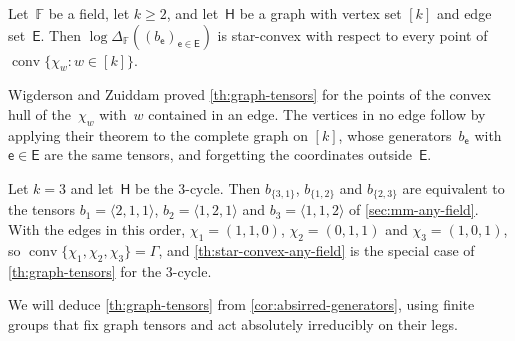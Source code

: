 \documentclass[11pt,letterpaper]{article}
\newcommand{\FF}{\mathbb{F}}
\DeclareMathOperator{\conv}{conv}
\begin{document}
\begin{theorem}\label{th:graph-tensors}
Let~$\FF$ be a field, let $k \geq 2$, and let~$\mathsf{H}$ be a graph with vertex set $[k]$ and edge set~$\mathsf{E}$. Then $\log \Delta_\FF((b_{\mathsf{e}})_{\mathsf{e} \in \mathsf{E}})$ is star-convex with respect to every point of $\conv\{\chi_w : w \in [k]\}$.
\end{theorem}

Wigderson and Zuiddam proved \cref{th:graph-tensors} for the points of the convex hull of the~$\chi_w$ with~$w$ contained in an edge. The vertices in no edge follow by applying their theorem to the complete graph on $[k]$, whose generators~$b_{\mathsf{e}}$ with $\mathsf{e} \in \mathsf{E}$ are the same tensors, and forgetting the coordinates outside~$\mathsf{E}$.

Let $k = 3$ and let~$\mathsf{H}$ be the $3$-cycle. Then $b_{\{3,1\}}$, $b_{\{1,2\}}$ and $b_{\{2,3\}}$ are equivalent to the tensors $b_1 = \langle 2,1,1 \rangle$, $b_2 = \langle 1,2,1 \rangle$ and $b_3 = \langle 1,1,2 \rangle$ of \cref{sec:mm-any-field}. With the edges in this order, $\chi_1 = (1,1,0)$, $\chi_2 = (0,1,1)$ and $\chi_3 = (1,0,1)$, so $\conv\{\chi_1, \chi_2, \chi_3\} = \Gamma$, and \cref{th:star-convex-any-field} is the special case of \cref{th:graph-tensors} for the $3$-cycle.

We will deduce \cref{th:graph-tensors} from \cref{cor:absirred-generators}, using finite groups that fix graph tensors and act absolutely irreducibly on their legs.
\end{document}
